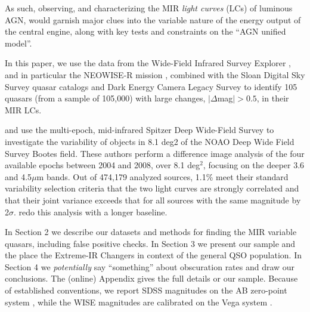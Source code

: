 \documentclass[apj]{emulateapj}
\begin{document}
As such, observing, and characterizing the MIR {\it light curves} (LCs) of
luminous AGN, would garnish major clues into the variable nature of
the energy output of the central engine, along with key tests and
constraints on the ``AGN unified model''.

In this paper, we use the data from the Wide-Field
Infrared Survey Explorer \citep[WISE; ][]{Wright10}, and in particular
the NEOWISE-R mission \citep{Mainzer14, Meisner16}, combined with the
Sloan Digital Sky Survey quasar catalogs \citep[DR7Q; ][]{Schneider10}
and Dark Energy Camera Legacy Survey \citep[DECaLS; ][]{Lang16} to
identify 105 quasars (from a sample of 105,000) with large changes,
$|\Delta$mag$|>0.5$, in their MIR LCs. 

\citet{Kozlowski2010} and use the multi-epoch, mid-infrared Spitzer
Deep Wide-Field Survey to investigate the variability of objects in
8.1 deg2 of the NOAO Deep Wide Field Survey Bootes field.  These
authors perform a difference image analysis of the four available
epochs between 2004 and 2008, over 8.1 deg$^2$, focusing on the deeper
3.6 and 4.5$\mu$m bands. Out of 474,179 analyzed sources, 1.1\% meet
their standard variability selection criteria that the two light
curves are strongly correlated and that their joint variance exceeds
that for all sources with the same magnitude by 2$\sigma$.
\citet{Kozlowski2016} redo this analysis with a longer baseline.

In Section 2 we describe our datasets and methods for finding the MIR
variable quasars, including false positive checks. In Section 3 we
present our sample and the place the Extreme-IR Changers in context of
the general QSO population. In Section 4 we {\it potentially} say
``something'' about obscuration rates and draw our conclusions. 
The (online) Appendix gives the full details or our sample. 
Because of established conventions, we report SDSS magnitudes on the
AB zero-point system \citep{Oke83, Fukugita96}, while the WISE
magnitudes are calibrated on the Vega system \citep{Wright10}.



\end{document}
